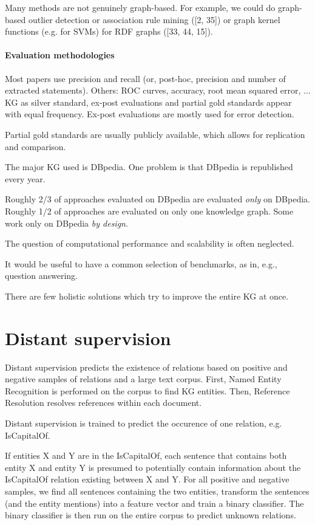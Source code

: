 Many methods are not genuinely graph-based. For example, we could do graph-based
outlier detection or association rule mining ([2, 35]) or graph kernel functions
(e.g. for SVMs) for RDF graphs ([33, 44, 15]).

\paragraph{Evaluation methodologies}

Most papers use precision and recall (or, post-hoc, precision and number of
extracted statements). Others: ROC curves, accuracy, root mean squared error,
...
KG as silver standard, ex-post evaluations and partial gold standards appear
with equal frequency. Ex-post evaluations are mostly used for error detection.

Partial gold standards are usually publicly available, which allows for
replication and comparison.

The major KG used is DBpedia. One problem is that DBpedia is republished every
year.

Roughly 2/3 of approaches evaluated on DBpedia are evaluated \textit{only} on
DBpedia. Roughly 1/2 of approaches are evaluated on only one knowledge graph.
Some work only on DBpedia \textit{by design}.

The question of computational performance and scalability is often neglected.

It would be useful to have a common selection of benchmarks, as in, e.g.,
question answering.

There are few holistic solutions which try to improve the entire KG at once.

\section{Distant supervision}
\label{distant-supervision}
Distant supervision\cite{distant-supervision} predicts the existence of
relations based on positive and negative samples of relations and a large text
corpus. First, Named Entity Recognition is performed on the corpus to find KG
entities.
Then, Reference Resolution resolves references within each document.

Distant supervision is trained to predict the occurence of one relation,
e.g. IsCapitalOf.

If entities X and Y are in the IsCapitalOf, each sentence that contains both
entity X and entity Y is presumed to potentially contain information about
the IsCapitalOf relation existing between X and Y.
For all positive and negative samples, we find all sentences containing the two
entities, transform the sentences (and the entity mentions) into a feature
vector and train a binary classifier.
The binary classifier is then run on the entire corpus to predict unknown
relations.

